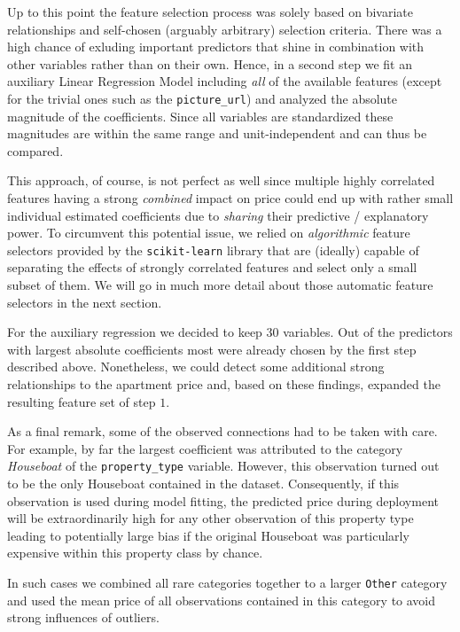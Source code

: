 \documentclass[12pt, letterpaper]{article}
\begin{document}
Up to this point the feature selection process was solely based on bivariate relationships and self-chosen (arguably arbitrary) selection criteria.
There was a high chance of exluding important predictors that shine in combination with other variables rather than on their own.
Hence, in a second step we fit an auxiliary Linear Regression Model including \emph{all} of the available features (except for the trivial ones such as the \verb|picture_url|) and analyzed the absolute magnitude of the coefficients.
Since all variables are standardized these magnitudes are within the same range and unit-independent and can thus be compared.

This approach, of course, is not perfect as well since multiple highly correlated features having a strong \emph{combined} impact on price could end up with rather small individual estimated coefficients due to \emph{sharing} their predictive / explanatory power.
To circumvent this potential issue, we relied on \emph{algorithmic} feature selectors provided by the \texttt{scikit-learn} library that are (ideally) capable of separating the effects of strongly correlated features and select only a small subset of them.
We will go in much more detail about those automatic feature selectors in the next section.

For the auxiliary regression we decided to keep $30$ variables.
Out of the predictors with largest absolute coefficients most were already chosen by the first step described above.
Nonetheless, we could detect some additional strong relationships to the apartment price and, based on these findings, expanded the resulting feature set of step $1$.

As a final remark, some of the observed connections had to be taken with care.
For example, by far the largest coefficient was attributed to the category \emph{Houseboat} of the \verb|property_type| variable.
However, this observation turned out to be the only Houseboat contained in the dataset.
Consequently, if this observation is used during model fitting, the predicted price during deployment will be extraordinarily high for any other observation of this property type leading to potentially large bias if the original Houseboat was particularly expensive within this property class by chance.

In such cases we combined all rare categories together to a larger \texttt{Other} category and used the mean price of all observations contained in this category to avoid strong influences of outliers.
\end{document}
